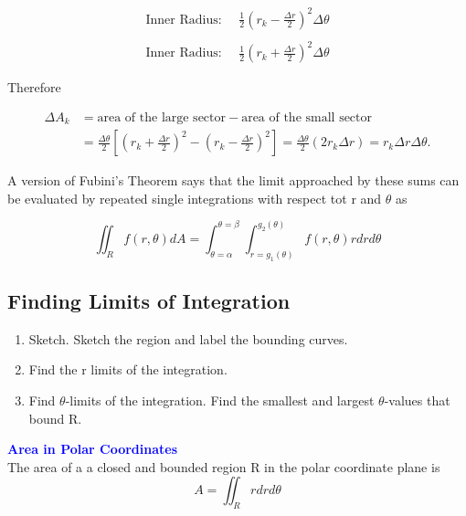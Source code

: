 \documentclass[12pt,a4paper,draft]{article}
\newenvironment{mynote}{\vspace{1\baselineskip}\begin{note}}{\end{note}\vspace{1\baselineskip}}
\begin{document}
\begin{align*}
    \text{Inner Radius: } \quad \frac{1}{2} \left( r_k - \frac{\Delta r}{2}\right)^2 \Delta \theta \\
    \\
    \text{Inner Radius: } \quad \frac{1}{2} \left( r_k + \frac{\Delta r}{2}\right)^2 \Delta \theta 
\end{align*}

Therefore 


\begin{align*}
    \Delta A_k &= \text{area of the large sector} - \text{area of the small sector}\\
    &=\frac{\Delta \theta}{2}\left[\left(r_k+\frac{\Delta r}{2}\right)^2-\left(r_k-\frac{\Delta r}{2}\right)^2\right]=\frac{\Delta \theta}{2}\left(2 r_k \Delta r\right)=r_k \Delta r \Delta \theta.
\end{align*}


A version of Fubini's Theorem says that the limit approached by these sums can be evaluated by repeated single integrations with respect tot r and \(\theta\) as

\[\iint_R f(r, \theta) dA = \int_{\theta = \alpha}^{\theta = \beta} \int_{r = g_1(\theta)}^{g_2(\theta)}f(r,\theta) r dr d\theta\]




\subsection{Finding Limits of Integration}

\begin{enumerate}
    \item Sketch. Sketch the region and label the bounding curves.
    \item Find the r limits of the integration. 
    \item Find \(\theta\)-limits of the integration. Find the smallest and largest \(\theta\)-values that bound R. 
\end{enumerate}





\begin{mynote}
    \textcolor{blue}{\textbf{Area in Polar Coordinates}} \\
    The area of a a closed and bounded region R in the polar coordinate plane is
    \[A = \iint_R r dr d \theta\]
\end{mynote}


\newpage
\end{document}

